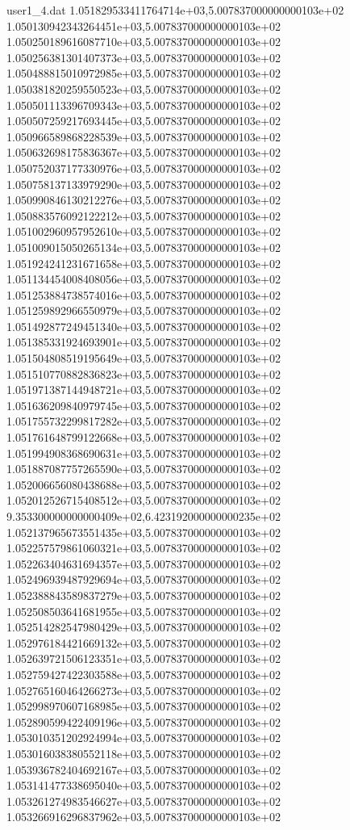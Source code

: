 \begin{filecontents}{user1_4.dat}
1.051829533411764714e+03,5.007837000000000103e+02
1.050130942343264451e+03,5.007837000000000103e+02
1.050250189616087710e+03,5.007837000000000103e+02
1.050256381301407373e+03,5.007837000000000103e+02
1.050488815010972985e+03,5.007837000000000103e+02
1.050381820259550523e+03,5.007837000000000103e+02
1.050501113396709343e+03,5.007837000000000103e+02
1.050507259217693445e+03,5.007837000000000103e+02
1.050966589868228539e+03,5.007837000000000103e+02
1.050632698175836367e+03,5.007837000000000103e+02
1.050752037177330976e+03,5.007837000000000103e+02
1.050758137133979290e+03,5.007837000000000103e+02
1.050990846130212276e+03,5.007837000000000103e+02
1.050883576092122212e+03,5.007837000000000103e+02
1.051002960957952610e+03,5.007837000000000103e+02
1.051009015050265134e+03,5.007837000000000103e+02
1.051924241231671658e+03,5.007837000000000103e+02
1.051134454008408056e+03,5.007837000000000103e+02
1.051253884738574016e+03,5.007837000000000103e+02
1.051259892966550979e+03,5.007837000000000103e+02
1.051492877249451340e+03,5.007837000000000103e+02
1.051385331924693901e+03,5.007837000000000103e+02
1.051504808519195649e+03,5.007837000000000103e+02
1.051510770882836823e+03,5.007837000000000103e+02
1.051971387144948721e+03,5.007837000000000103e+02
1.051636209840979745e+03,5.007837000000000103e+02
1.051755732299817282e+03,5.007837000000000103e+02
1.051761648799122668e+03,5.007837000000000103e+02
1.051994908368690631e+03,5.007837000000000103e+02
1.051887087757265590e+03,5.007837000000000103e+02
1.052006656080438688e+03,5.007837000000000103e+02
1.052012526715408512e+03,5.007837000000000103e+02
9.353300000000000409e+02,6.423192000000000235e+02
1.052137965673551435e+03,5.007837000000000103e+02
1.052257579861060321e+03,5.007837000000000103e+02
1.052263404631694357e+03,5.007837000000000103e+02
1.052496939487929694e+03,5.007837000000000103e+02
1.052388843589837279e+03,5.007837000000000103e+02
1.052508503641681955e+03,5.007837000000000103e+02
1.052514282547980429e+03,5.007837000000000103e+02
1.052976184421669132e+03,5.007837000000000103e+02
1.052639721506123351e+03,5.007837000000000103e+02
1.052759427422303588e+03,5.007837000000000103e+02
1.052765160464266273e+03,5.007837000000000103e+02
1.052998970607168985e+03,5.007837000000000103e+02
1.052890599422409196e+03,5.007837000000000103e+02
1.053010351202924994e+03,5.007837000000000103e+02
1.053016038380552118e+03,5.007837000000000103e+02
1.053936782404692167e+03,5.007837000000000103e+02
1.053141477338695040e+03,5.007837000000000103e+02
1.053261274983546627e+03,5.007837000000000103e+02
1.053266916296837962e+03,5.007837000000000103e+02

\end{filecontents}
